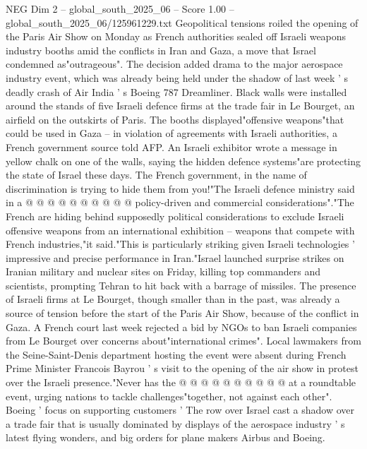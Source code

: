 \begin{textsample}{NEG Dim 2 – global\_south\_2025\_06 – Score 1.00 – global\_south\_2025\_06/125961229.txt}  \label{ex:f2_neg_368}
Geopolitical tensions roiled the opening of the Paris Air Show on Monday as French authorities sealed off Israeli weapons industry booths amid the conflicts in Iran and Gaza, a move that Israel condemned as"outrageous".
The decision added drama to the major aerospace industry event, which was already being held under the shadow of last week ' s deadly crash of Air India ' s Boeing 787 Dreamliner.
Black walls were installed around the stands of five Israeli defence firms at the trade fair in Le Bourget, an airfield on the outskirts of Paris.
The booths displayed"offensive weapons"that could be used in Gaza -- in violation of agreements with Israeli authorities, a French government source told AFP.
An Israeli exhibitor wrote a message in yellow chalk on one of the walls, saying the hidden defence systems"are protecting the state of Israel these days.
The French government, in the name of discrimination is trying to hide them from you!"The Israeli defence ministry said in a @ @ @ @ @ @ @ @ @ @ policy-driven and commercial considerations"."The French are hiding behind supposedly political considerations to exclude Israeli offensive weapons from an international exhibition -- weapons that compete with French industries,"it said."This is particularly striking given Israeli technologies ' impressive and precise performance in Iran."Israel launched surprise strikes on Iranian military and nuclear sites on Friday, killing top commanders and scientists, prompting Tehran to hit back with a barrage of missiles.
The presence of Israeli firms at Le Bourget, though smaller than in the past, was already a source of tension before the start of the Paris Air Show, because of the conflict in Gaza.
A French court last week rejected a bid by NGOs to ban Israeli companies from Le Bourget over concerns about"international crimes".
Local lawmakers from the Seine-Saint-Denis department hosting the event were absent during French Prime Minister Francois Bayrou ' s visit to the opening of the air show in protest over the Israeli presence."Never has the @ @ @ @ @ @ @ @ @ @ at a roundtable event, urging nations to tackle challenges"together, not against each other".
Boeing ' focus on supporting customers ' The row over Israel cast a shadow over a trade fair that is usually dominated by displays of the aerospace industry ' s latest flying wonders, and big orders for plane makers Airbus and Boeing.

\end{textsample}
